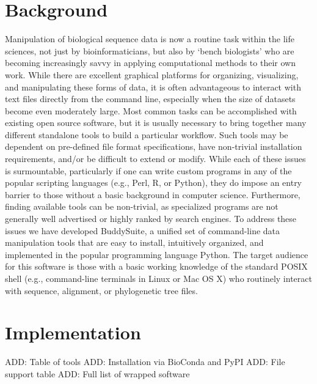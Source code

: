 \documentclass[twocolumn]{bmcart}%
\begin{document}
\section*{Background}
Manipulation of biological sequence data is now a routine task within the life sciences, not just by bioinformaticians, but also by `bench biologists' who are becoming increasingly savvy in applying computational methods to their own work. While there are excellent graphical platforms for organizing, visualizing, and manipulating these forms of data, it is often advantageous to interact with text files directly from the command line, especially when the size of datasets become even moderately large. Most common tasks can be accomplished with existing open source software, but it is usually necessary to bring together many different standalone tools to build a particular workflow. Such tools may be dependent on pre-defined file format specifications, have non-trivial installation requirements, and/or be difficult to extend or modify. While each of these issues is surmountable, particularly if one can write custom programs in any of the popular scripting languages (e.g., Perl, R, or Python), they do impose an entry barrier to those without a basic background in computer science. Furthermore, finding available tools can be non-trivial, as specialized programs are not generally well advertised or highly ranked by search engines. To address these issues we have developed BuddySuite, a unified set of command-line data manipulation tools that are easy to install, intuitively organized, and implemented in the popular programming language Python. The target audience for this software is those with a basic working knowledge of the standard POSIX shell (e.g., command-line terminals in Linux or Mac OS X) who routinely interact with sequence, alignment, or phylogenetic tree files.


\section*{Implementation}
ADD: Table of tools
ADD: Installation via BioConda and PyPI
ADD: File support table
ADD: Full list of wrapped software
\end{document}

